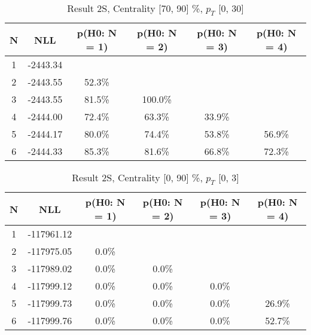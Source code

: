 \begin{table}[htb]
	\begin{center}
	\caption{Result 2S, Centrality [70, 90] \%, $p_{T}$ [0, 30] \GeV
}
{\footnotesize\renewcommand{\arraystretch}{1.4}
		\begin{tabular}{cc||>{\columncolor[gray]{0.8}}cccc}
			N & NLL & p(H0: N = 1) & p(H0: N = 2) & p(H0: N = 3) & p(H0: N = 4)\\ 
		\hline
1 & -2443.34 & & & & \\
2 & -2443.55 & 52.3\% & & & \\
3 & -2443.55 & 81.5\% & 100.0\% & & \\
4 & -2444.00 & 72.4\% & 63.3\% & 33.9\% & \\
5 & -2444.17 & 80.0\% & 74.4\% & 53.8\% & 56.9\% \\
6 & -2444.33 & 85.3\% & 81.6\% & 66.8\% & 72.3\% \\
	\end{tabular}
		\label{tab:lab}
	}
	\end{center}\end{table}

\begin{table}[htb]
	\begin{center}
	\caption{Result 2S, Centrality [0, 90] \%, $p_{T}$ [0, 3] \GeV
}
{\footnotesize\renewcommand{\arraystretch}{1.4}
		\begin{tabular}{cc||ccc>{\columncolor[gray]{0.8}}c}
			N & NLL & p(H0: N = 1) & p(H0: N = 2) & p(H0: N = 3) & p(H0: N = 4)\\ 
		\hline
1 & -117961.12 & & & & \\
2 & -117975.05 & 0.0\% & & & \\
3 & -117989.02 & 0.0\% & 0.0\% & & \\
4 & -117999.12 & 0.0\% & 0.0\% & 0.0\% & \\
5 & -117999.73 & 0.0\% & 0.0\% & 0.0\% & 26.9\% \\
6 & -117999.76 & 0.0\% & 0.0\% & 0.0\% & 52.7\% \\
	\end{tabular}
		\label{tab:lab}
	}
	\end{center}\end{table}

